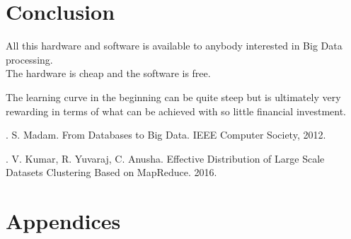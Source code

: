 \documentclass[12pt]{article} %
\begin{document}
	
	
	
	
	
	
	
	\section{Conclusion} %
	
	All this hardware and software is available to anybody interested in Big Data processing.\\
	
	The hardware is cheap and the software is free.\
	
	The learning curve in the beginning can be quite steep but is ultimately very rewarding in terms of what can be achieved with so little financial investment.
	
	
	
	
	\newpage
	
	
	\begin{thebibliography}{99} %
		
		. S. Madam. From Databases to Big Data. IEEE Computer Society, 2012.
	
		
		. V. Kumar, R. Yuvaraj, C. Anusha. Effective Distribution of Large Scale Datasets Clustering Based on MapReduce. 2016.

		
	\end{thebibliography}
	
	\section{Appendices}
	
	
\end{document}
